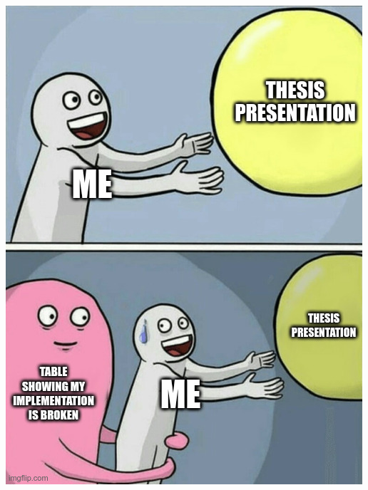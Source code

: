 \documentclass{beamer}
\begin{document}
\begin{frame}[containsverbatim]
\begin{center}
\includegraphics[height=0.9\paperheight]{figures/meme.jpg}
\end{center}
\end{frame}
\end{document}
